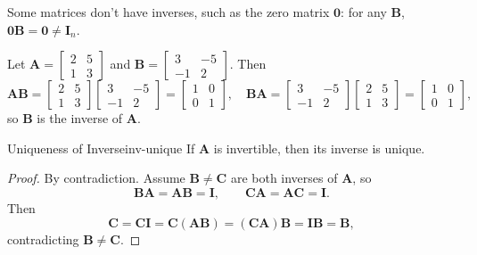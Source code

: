 \begin{remark}
  Some matrices don't have inverses, such as the zero matrix $\mathbf{0}$: for any $\mathbf{B}$, $\mathbf{0}\mathbf{B} = \mathbf{0} \neq \mathbf{I}_n$.
\end{remark}

\begin{example}
  Let $\mathbf{A} =
    \begin{bmatrix}
      2 & 5 \\ 1 & 3
    \end{bmatrix}
  $ and $\mathbf{B} =
    \begin{bmatrix}
      3 & -5 \\ -1 & 2
    \end{bmatrix}
  $. Then
  \[
    \mathbf{A}\mathbf{B}
    =
    \begin{bmatrix}
      2 & 5 \\ 1 & 3
    \end{bmatrix}
    \begin{bmatrix}
      3 & -5 \\ -1 & 2
    \end{bmatrix}
    =
    \begin{bmatrix}
      1 & 0 \\ 0 & 1
    \end{bmatrix}
    ,
    \quad
    \mathbf{B}\mathbf{A}
    =
    \begin{bmatrix}
      3 & -5 \\ -1 & 2
    \end{bmatrix}
    \begin{bmatrix}
      2 & 5 \\ 1 & 3
    \end{bmatrix}
    =
    \begin{bmatrix}
      1 & 0 \\ 0 & 1
    \end{bmatrix}
    ,
  \]
  so $\mathbf{B}$ is the inverse of $\mathbf{A}$.
\end{example}

\begin{theorem}{Uniqueness of Inverse}{inv-unique}
  If $\mathbf{A}$ is invertible, then its inverse is unique.
\end{theorem}

\begin{proof}
  By contradiction. Assume $\mathbf{B} \neq \mathbf{C}$ are both inverses of $\mathbf{A}$, so
  \[
    \mathbf{B}\mathbf{A} = \mathbf{A}\mathbf{B} = \mathbf{I},
    \qquad
    \mathbf{C}\mathbf{A} = \mathbf{A}\mathbf{C} = \mathbf{I}.
  \]
  Then
  \[
    \mathbf{C}
    = \mathbf{C}\mathbf{I}
    = \mathbf{C}(\mathbf{A}\mathbf{B})
    = (\mathbf{C}\mathbf{A})\mathbf{B}
    = \mathbf{I}\mathbf{B}
    = \mathbf{B},
  \]
  contradicting $\mathbf{B} \neq \mathbf{C}$.
\end{proof}

